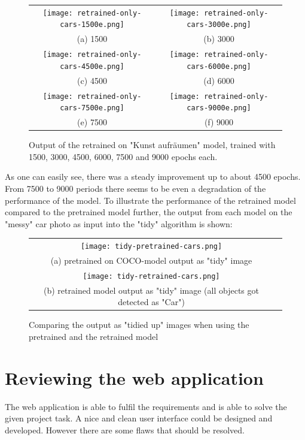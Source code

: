 \begin{figure}[H]
\begin{tabular}{cc}
 \texttt{[image: retrained-only-cars-1500e.png]} &   \texttt{[image: retrained-only-cars-3000e.png]} \\
 (a) 1500 & (b) 3000 \\[6pt]
 \texttt{[image: retrained-only-cars-4500e.png]} &   \texttt{[image: retrained-only-cars-6000e.png]} \\
(c) 4500 & (d) 6000 \\[6pt]
 \texttt{[image: retrained-only-cars-7500e.png]} &   \texttt{[image: retrained-only-cars-9000e.png]} \\
(e) 7500 & (f) 9000 \\[6pt]
\end{tabular}
\caption{Output of the retrained on "Kunst aufräumen" model, trained with 1500, 3000, 4500, 6000, 7500 and 9000 epochs each.}
\label{fig:epochs-output}
\end{figure}

As one can easily see, there was a steady improvement up to about 4500 epochs. From 7500 to 9000 periods there seems to be even a degradation of the performance of the model. To illustrate the performance of the retrained model compared to the pretrained model further, the output from each model on the "messy" car photo as input into the "tidy" algorithm is shown:

\begin{figure}[H]
\begin{tabular}{cc}
 \texttt{[image: tidy-pretrained-cars.png]} \\
 (a) pretrained on COCO-model output as "tidy" image \\[6pt]
 \texttt{[image: tidy-retrained-cars.png]} \\
 (b) retrained  model output as "tidy" image (all objects got detected as "Car")  \\[6pt]
\end{tabular}
\caption{Comparing the output as "tidied up" images when using the pretrained and the retrained model}
\label{fig:compare-output}
\end{figure}

\section{Reviewing the web application}

The web application is able to fulfil the requirements and is able to solve the given project task. A nice and clean user interface could be designed and developed. However there are some flaws that should be resolved.

